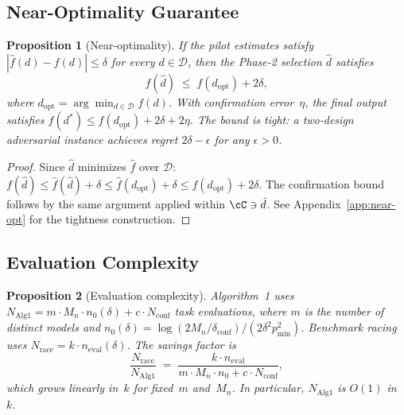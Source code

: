 \documentclass[11pt]{article}
\newtheorem{proposition}{Proposition}
\newtheorem{proof}{Proof}
\newcommand{\cD}{\mathcal{D}}
\newcommand{\Mn}{M_n}
\newcommand{\pmin}{p_{\min}}
\newcommand{\dconf}{\delta_{\mathrm{conf}}}
\begin{document}
\subsection{Near-Optimality Guarantee}

\begin{proposition}[Near-optimality]
\label{prop:near-opt}
If the pilot estimates satisfy $|\hat{f}(d) - f(d)| \le \delta$ for every
$d \in \cD$, then the Phase-2 selection $\hat{d}$ satisfies
\begin{equation}
\label{eq:near-opt}
  f(\hat{d}) \;\le\; f(d_{\mathrm{opt}}) + 2\delta,
\end{equation}
where $d_{\mathrm{opt}} = \arg\min_{d \in \cD} f(d)$.
With confirmation error~$\eta$, the final output satisfies
$f(d^*) \le f(d_{\mathrm{opt}}) + 2\delta + 2\eta$.
The bound is tight: a two-design adversarial instance achieves
regret $2\delta - \epsilon$ for any $\epsilon > 0$.
\end{proposition}

\begin{proof}
Since $\hat{d}$ minimizes $\hat{f}$ over $\cD$:
$f(\hat{d}) \le \hat{f}(\hat{d}) + \delta
\le \hat{f}(d_{\mathrm{opt}}) + \delta
\le f(d_{\mathrm{opt}}) + 2\delta$.
The confirmation bound follows by the same argument applied within
$\cC \ni \hat{d}$.  See Appendix~\ref{app:near-opt} for the tightness
construction.
\end{proof}

\subsection{Evaluation Complexity}

\begin{proposition}[Evaluation complexity]
\label{prop:eval-complexity}
Algorithm~1 uses
$N_{\mathrm{Alg1}} = m \cdot \Mn \cdot n_0(\delta) + c \cdot N_{\mathrm{conf}}$
task evaluations, where $m$ is the number of distinct models and
$n_0(\delta) = \log(2\Mn/\dconf) / (2\delta^2 \pmin^2)$.
Benchmark racing uses $N_{\mathrm{race}} = k \cdot n_{\mathrm{eval}}(\delta)$.
The savings factor is
\begin{equation}
\label{eq:savings}
  \frac{N_{\mathrm{race}}}{N_{\mathrm{Alg1}}}
  \;=\; \frac{k \cdot n_{\mathrm{eval}}}{m \cdot \Mn \cdot n_0 + c \cdot N_{\mathrm{conf}}},
\end{equation}
which grows linearly in~$k$ for fixed~$m$ and~$\Mn$.
In particular, $N_{\mathrm{Alg1}}$ is $O(1)$ in~$k$.
\end{proposition}
\end{document}
